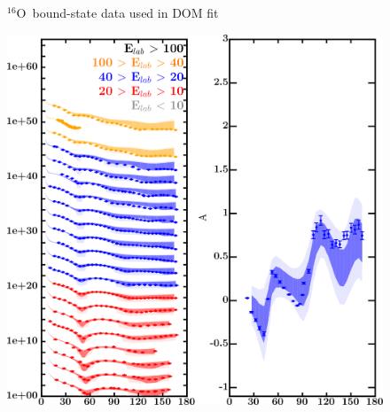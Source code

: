 \documentclass[twocolumn,secnumarabic,amssymb, nobibnotes, aps, prl,
superscriptaddress, nobalancelastpage, draft]{revtex4}
\newcommand{\oSix}{\ensuremath{^{16}}O}
\begin{document}
\begin{figure}[!htb]
\begin{minipage}{0.4\linewidth}
        \label{DOM_o16_BE}
    \end{minipage}
    \caption{\oSix\ bound-state data used in DOM fit}
    \label{DOM_o16_structural}
\end{figure}

\begin{figure}[!htb]
    \centering
    \begin{minipage}{0.4\linewidth}
        \centering
        \includegraphics[width=\linewidth]{figures/o18_protonElastic.png}
        \label{DOM_o18_proton_elastic}
    \end{minipage}
    \begin{minipage}{0.4\linewidth}
        \centering
        \begin{minipage}[c]{0.5\linewidth}
            \centering

\end{minipage}
\end{minipage}
\end{figure}
\end{document}
